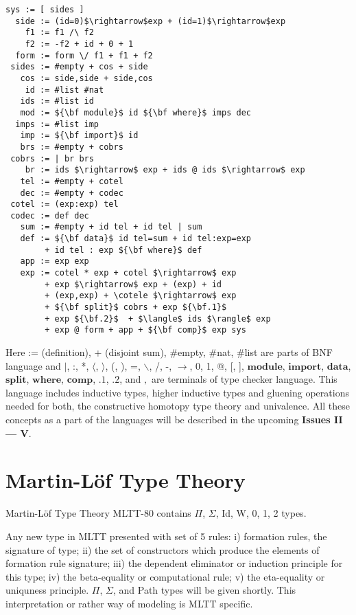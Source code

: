 \documentclass{article}
\theoremstyle{definition}
\begin{document}
\begin{lstlisting}[mathescape=true]
   sys := [ sides ]
  side := (id=0)$\rightarrow$exp + (id=1)$\rightarrow$exp
    f1 := f1 /\ f2
    f2 := -f2 + id + 0 + 1
  form := form \/ f1 + f1 + f2
 sides := #empty + cos + side
   cos := side,side + side,cos
    id := #list #nat
   ids := #list id
   mod := ${\bf module}$ id ${\bf where}$ imps dec
  imps := #list imp
   imp := ${\bf import}$ id
   brs := #empty + cobrs
 cobrs := | br brs
    br := ids $\rightarrow$ exp + ids @ ids $\rightarrow$ exp
   tel := #empty + cotel
   dec := #empty + codec
 cotel := (exp:exp) tel
 codec := def dec
   sum := #empty + id tel + id tel | sum
   def := ${\bf data}$ id tel=sum + id tel:exp=exp
        + id tel : exp ${\bf where}$ def
   app := exp exp
   exp := cotel * exp + cotel $\rightarrow$ exp
        + exp $\rightarrow$ exp + (exp) + id
        + (exp,exp) + \cotele $\rightarrow$ exp
        + ${\bf split}$ cobrs + exp ${\bf.1}$
        + exp ${\bf.2}$  + $\langle$ ids $\rangle$ exp
        + exp @ form + app + ${\bf comp}$ exp sys
\end{lstlisting}

Here := (definition), + (disjoint sum), \#empty, \#nat, \#list are parts of BNF language and
$\rvert$, :, *, $\langle$, $\rangle$, (, ), =, $\backslash$, /, -, $\rightarrow$, 0, 1, @, [, ],
$\mathbf{module}$, $\mathbf{import}$,
$\mathbf{data}$, $\mathbf{split}$, $\mathbf{where}$, $\mathbf{comp}$, $\mathbf{.1}$, $\mathbf{.2}$,
 and $,$ are terminals of type checker language. This language includes
inductive types, higher inductive types and gluening operations needed for
both, the constructive homotopy type theory and univalence. All these concepts as a part of the languages
will be described in the upcoming {\bf Issues II --- V}.

\section{Martin-Löf Type Theory}

Martin-Löf Type Theory MLTT-80 contains $\Pi$, $\Sigma$, Id, W, 0, 1, 2 types.

Any new type in MLTT presented with set of 5 rules: i) formation rules, the signature of type;
ii) the set of constructors which produce the elements of formation rule signature;
iii) the dependent eliminator or induction principle for this type;
iv) the beta-equality or computational rule;
v) the eta-equality or uniquness principle. $\Pi$, $\Sigma$, and Path
types will be given shortly. This interpretation or rather way of modeling is MLTT specific.
\end{document}
